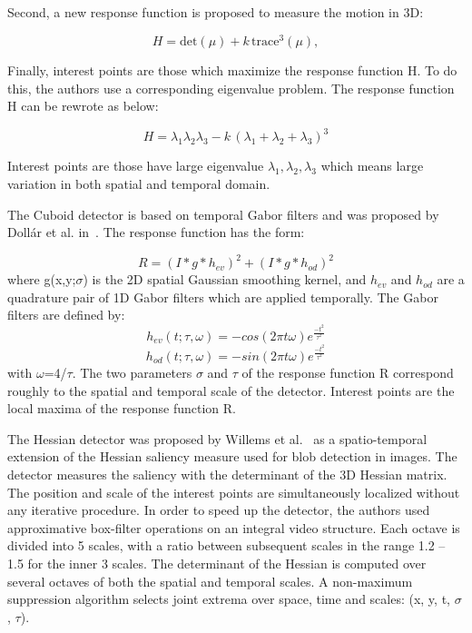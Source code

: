Second, a new response function is proposed to measure the motion in 3D:

\begin{equation}
	H = \mbox{det}(\mu) + k\, \mbox{trace}^{3}(\mu),
\end{equation}

Finally, interest points are those which maximize the response function H. To do this, the authors use a corresponding eigenvalue problem. The response function H can be rewrote as below:

\begin{equation}
	H = \lambda_{1}\lambda_{2}\lambda_{3} - k\, (\lambda_{1}+\lambda_{2}+\lambda_{3})^{3}
\end{equation}

Interest points are those have large eigenvalue $\lambda_{1},\lambda_{2},\lambda_{3}$ which means large variation in both spatial and temporal domain.


The Cuboid detector is based on temporal Gabor filters and was proposed by Dollár et al. in~\cite{Dollar05VSPETS}. The response function has the form:

\begin{equation}
	R = (I*g*h_{ev})^{2}+(I*g*h_{od})^{2}
\end{equation}
where g(x,y;$\sigma$) is the 2D spatial Gaussian smoothing kernel, and $h_{ev}$ and $h_{od}$ are a quadrature pair of 1D Gabor filters which are applied temporally.
The Gabor filters are defined by:
\begin{equation}
	h_{ev}(t;\tau,\omega) = -cos(2\pi t\omega)e^{\frac{-t^{2}}{\tau^{2}}}
\end{equation}
\begin{equation}
	h_{od}(t;\tau,\omega) = -sin(2\pi t\omega)e^{\frac{-t^{2}}{\tau^{2}}}
\end{equation}
with $\omega$=4/$\tau$. The two parameters $\sigma$ and $\tau$ of the response function R correspond roughly to the spatial and temporal scale of the detector. Interest points are the local maxima of the response function R.

The Hessian detector was proposed by Willems et al.~\cite{willems2008efficient} as a spatio-temporal extension of the Hessian saliency measure used for blob detection in images. The detector measures the saliency with the determinant of the 3D Hessian matrix. The position and scale of the interest points are simultaneously localized without any iterative procedure. In order to speed up the detector, the authors used approximative box-filter operations on an integral video structure. Each octave is divided into 5 scales, with a ratio between subsequent scales in the range 1.2 -- 1.5 for the inner 3 scales. The determinant of the Hessian is computed over several octaves of both the spatial and temporal scales. A non-maximum suppression algorithm selects joint extrema over space, time and scales: (x, y, t, $\sigma$, $\tau$).
	

